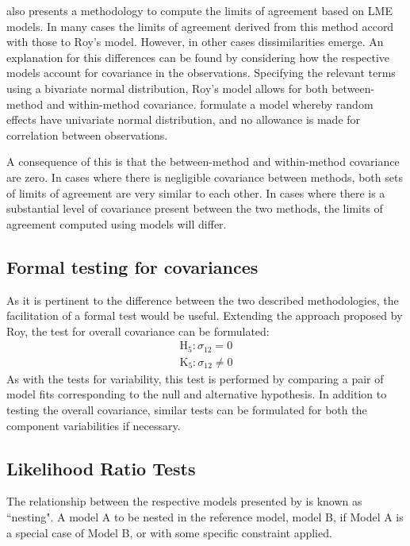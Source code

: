 \documentclass[Chap4main.tex]{subfiles}
\begin{document}
\citet{BXC2008} also presents a methodology to compute the limits of agreement based on LME models. In many cases the limits of agreement derived from this method accord with those to Roy's model. However, in other cases dissimilarities emerge. An explanation for this differences can be found by considering how the respective models account for covariance in the observations. Specifying the relevant terms using a bivariate normal distribution, Roy's model allows for both between-method and within-method covariance. \citet{BXC2008} formulate a model whereby random effects have univariate normal distribution, and no allowance is made for correlation between observations.

A consequence of this is that the between-method and within-method covariance are zero. In cases where there is negligible covariance between methods, both sets of limits of agreement are very similar to each other. In cases where there is a substantial level of covariance present between the two methods, the limits of agreement computed using models will differ.

\subsection{Formal testing for covariances }
As it is pertinent to the difference between the two described methodologies, the facilitation of a formal test would be useful. Extending the approach proposed by Roy, the test for overall covariance can be formulated:
\begin{eqnarray*}
\operatorname{H_5} : \sigma_{12} = 0 \\
\operatorname{K_5} : \sigma_{12} \neq 0
\end{eqnarray*}
As with the tests for variability, this test is performed by comparing a pair of model fits corresponding to the null and alternative hypothesis. In addition to testing the overall covariance, similar tests can be formulated for both the component variabilities if necessary.


\newpage
\subsection{Likelihood Ratio Tests}
The relationship between the respective models presented by \citet{roy} is known as ``nesting".
A model A to be nested in the reference model, model B, if Model A is a special case of Model B, or with some specific constraint applied.
\end{document}
